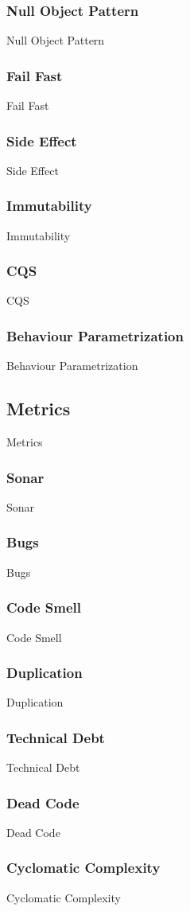 \subsubsection{Null Object Pattern}
Null Object Pattern

\subsubsection{Fail Fast}
Fail Fast

\subsubsection{Side Effect}
Side Effect

\subsubsection{Immutability}
Immutability

\subsubsection{CQS}
CQS

\subsubsection{Behaviour Parametrization}
Behaviour Parametrization

\subsection{Metrics}\label{subsec:metrics}
Metrics

\subsubsection{Sonar}
Sonar

\subsubsection{Bugs}
Bugs

\subsubsection{Code Smell}
Code Smell

\subsubsection{Duplication}
Duplication

\subsubsection{Technical Debt}
Technical Debt

\subsubsection{Dead Code}
Dead Code

\subsubsection{Cyclomatic Complexity}
Cyclomatic Complexity
